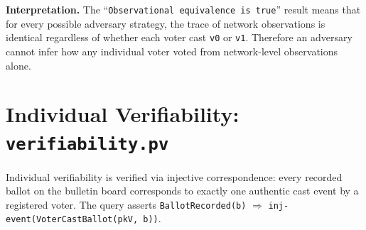 \textbf{Interpretation.} The ``\texttt{Observational equivalence is true}'' result means that for every possible adversary strategy, the trace of network observations is identical regardless of whether each voter cast \texttt{v0} or \texttt{v1}. Therefore an adversary cannot infer how any individual voter voted from network-level observations alone.

\section{Individual Verifiability: \texttt{verifiability.pv}}
\label{sec:appx-proverif-verifiability}

Individual verifiability is verified via injective correspondence: every recorded ballot on the bulletin board corresponds to exactly one authentic cast event by a registered voter. The query asserts \texttt{BallotRecorded(b)} $\Longrightarrow$ \texttt{inj-event(VoterCastBallot(pkV, b))}.

